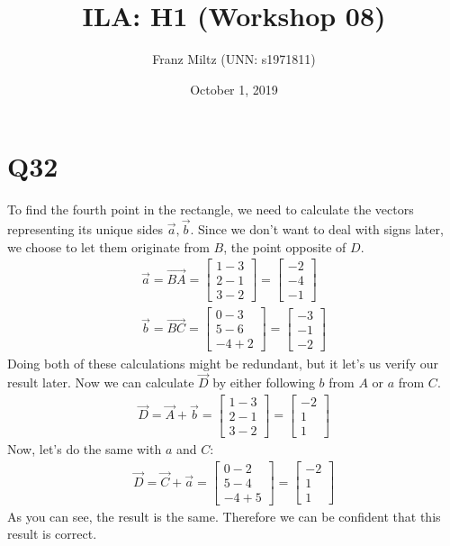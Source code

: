 \documentclass{article}
\title{ILA: H1 (Workshop 08)}
\author{Franz Miltz (UNN: s1971811)}
\date{October 1, 2019}
\begin{document}
\maketitle
\section*{Q32}
To find the fourth point in the rectangle, we need to calculate the vectors representing its unique sides $\vec a, \vec b$. Since we don't want to deal with signs later, we choose to let them originate from $B$, the point opposite of $D$.
\begin{align}
    \vec a = \vec{BA} =
    \begin{bmatrix}
        1 - 3 \\
        2 - 1 \\
        3 - 2
    \end{bmatrix} =
    \begin{bmatrix}
        -2 \\
        -4 \\
        -1
    \end{bmatrix} \\
    \vec b = \vec{BC} =
    \begin{bmatrix}
        0 - 3 \\
        5 - 6 \\
        -4 + 2
    \end{bmatrix} =
    \begin{bmatrix}
        -3 \\
        -1 \\
        -2
    \end{bmatrix}
\end{align}
Doing both of these calculations might be redundant, but it let's us verify our result later. Now we can calculate $\vec D$ by either following $b$ from $A$ or $a$ from $C$.
\begin{align}
    \vec D = \vec A + \vec b =
    \begin{bmatrix}
        1 - 3 \\
        2 - 1 \\
        3 - 2
    \end{bmatrix} =
    \begin{bmatrix}
        -2 \\
        1  \\
        1
    \end{bmatrix}
\end{align}
Now, let's do the same with $a$ and $C$:
\begin{align}
    \vec D = \vec C + \vec a =
    \begin{bmatrix}
        0 - 2 \\
        5 - 4 \\
        -4 + 5
    \end{bmatrix} =
    \begin{bmatrix}
        -2 \\
        1  \\
        1
    \end{bmatrix}
\end{align}
As you can see, the result is the same. Therefore we can be confident that this result is correct.
\end{document}
